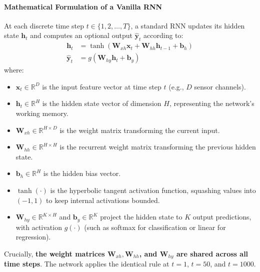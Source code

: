 \paragraph{Mathematical Formulation of a Vanilla RNN}
At each discrete time step $t \in \{1, 2, \dots, T\}$, a standard RNN updates its hidden state $\mathbf{h}_t$ and computes an optional output $\hat{\mathbf{y}}_t$ according to:
\begin{align}
\mathbf{h}_t &= \tanh(\mathbf{W}_{xh} \mathbf{x}_t + \mathbf{W}_{hh} \mathbf{h}_{t-1} + \mathbf{b}_h)\label{eq:rnn_hidden} \\
\hat{\mathbf{y}}_t &= g(\mathbf{W}_{hy} \mathbf{h}_t + \mathbf{b}_y)\label{eq:rnn_output}
\end{align}
where:
\begin{itemize}
    \item $\mathbf{x}_t \in \mathbb{R}^{D}$ is the input feature vector at time step $t$ (e.g., $D$ sensor channels).
    \item $\mathbf{h}_t \in \mathbb{R}^{H}$ is the hidden state vector of dimension $H$, representing the network's working memory.
    \item $\mathbf{W}_{xh} \in \mathbb{R}^{H \times D}$ is the weight matrix transforming the current input.
    \item $\mathbf{W}_{hh} \in \mathbb{R}^{H \times H}$ is the recurrent weight matrix transforming the previous hidden state.
    \item $\mathbf{b}_h \in \mathbb{R}^{H}$ is the hidden bias vector.
    \item $\tanh(\cdot)$ is the hyperbolic tangent activation function, squashing values into $(-1, 1)$ to keep internal activations bounded.
    \item $\mathbf{W}_{hy} \in \mathbb{R}^{K \times H}$ and $\mathbf{b}_y \in \mathbb{R}^{K}$ project the hidden state to $K$ output predictions, with activation $g(\cdot)$ (such as softmax for classification or linear for regression).
\end{itemize}

Crucially, \textbf{the weight matrices $\mathbf{W}_{xh}, \mathbf{W}_{hh}$, and $\mathbf{W}_{hy}$ are shared across all time steps}. The network applies the identical rule at $t=1$, $t=50$, and $t=1000$.

